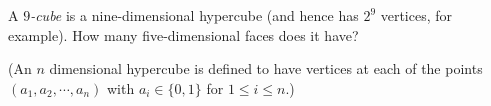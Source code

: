 A \emph{$9$-cube} is a nine-dimensional hypercube (and hence has $2^9$ vertices, for example). How many five-dimensional faces does it have?

(An $n$ dimensional hypercube is defined to have vertices at each of the points $(a_1,a_2,\cdots ,a_n)$ with $a_i\in \{0,1\}$ for $1\le i\le n$.)
